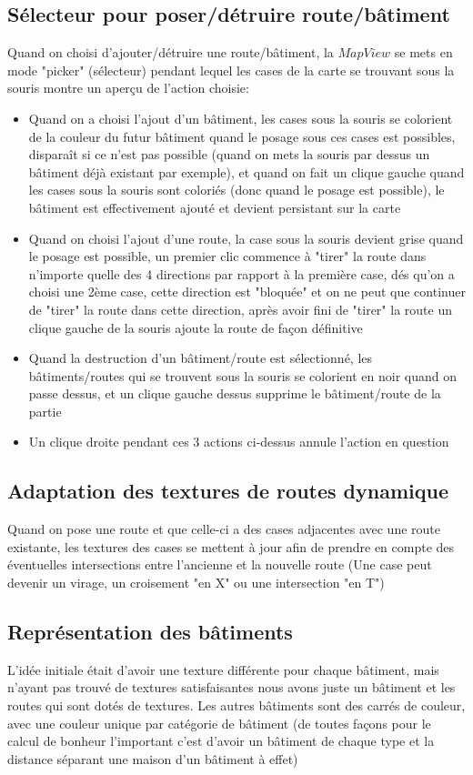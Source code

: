 \documentclass[a4paper,10pt,openany,oneside]{report}
\begin{document}
\subsection{Sélecteur pour poser/détruire route/bâtiment}
Quand on choisi d'ajouter/détruire une route/bâtiment, la $MapView$ se mets en mode "picker" (sélecteur) pendant lequel les cases de la carte se trouvant sous la souris montre un aperçu de l'action choisie:
\begin{itemize}
\item Quand on a choisi l'ajout d'un bâtiment, les cases sous la souris se colorient de la couleur du futur bâtiment quand le posage sous ces cases est possibles, disparaît si ce n'est pas possible (quand on mets la souris par dessus un bâtiment déjà existant par exemple), et quand on fait un clique gauche quand les cases sous la souris sont coloriés (donc quand le posage est possible), le bâtiment est effectivement ajouté et devient persistant sur la carte
\item Quand on choisi l'ajout d'une route, la case sous la souris devient grise quand le posage est possible, un premier clic commence à "tirer" la route dans n'importe quelle des 4 directions par rapport à la première case, dés qu'on a choisi une 2ème case, cette direction est "bloquée" et on ne peut que continuer de "tirer" la route dans cette direction, après avoir fini de "tirer" la route un clique gauche de la souris ajoute la route de façon définitive
\item Quand la destruction d'un bâtiment/route est sélectionné, les bâtiments/routes qui se trouvent sous la souris se colorient en noir quand on passe dessus, et un clique gauche dessus supprime le bâtiment/route de la partie
\item Un clique droite pendant ces 3 actions ci-dessus annule l'action en question
\end{itemize}
\subsection{Adaptation des textures de routes dynamique}
Quand on pose une route et que celle-ci a des cases adjacentes avec une route existante, les textures des cases se mettent à jour afin de prendre en compte des éventuelles intersections entre l'ancienne et la nouvelle route (Une case peut devenir un virage, un croisement "en X" ou une intersection "en T")
\subsection{Représentation des bâtiments}
L'idée initiale était d'avoir une texture différente pour chaque bâtiment, mais n'ayant pas trouvé de textures satisfaisantes nous avons juste un bâtiment et les routes qui sont dotés de textures.
\newline
Les autres bâtiments sont des carrés de couleur, avec une couleur unique par catégorie de bâtiment (de toutes façons pour le calcul de bonheur l'important c'est d'avoir un bâtiment de chaque type et la distance séparant une maison d'un bâtiment à effet)
\end{document}
